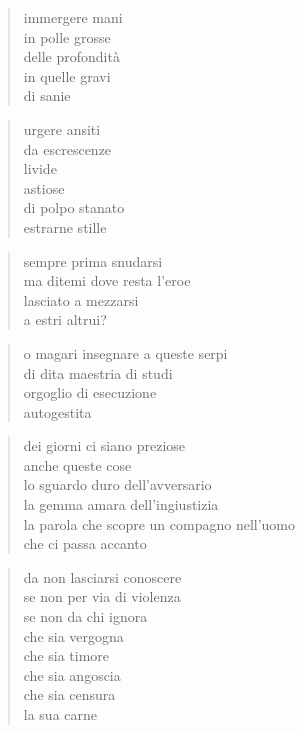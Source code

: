 \clearpage



	\begin{verse}
		immergere mani\\
		in polle grosse\\
		delle profondità\\
		in quelle gravi\\
		di sanie
	\end{verse}

	\begin{verse}
		urgere ansiti\\
		da escrescenze\\
		livide\\
		astiose\\
		di polpo stanato\\
		estrarne stille
	\end{verse}

	\begin{verse}
		sempre prima snudarsi\\
		ma ditemi dove resta l’eroe\\
		lasciato a mezzarsi\\
		a estri altrui?
	\end{verse}

	\begin{verse}
		o magari insegnare a queste serpi\\
		di dita maestria di studi\\
		orgoglio di esecuzione\\
		autogestita
	\end{verse}


\clearpage



	\begin{verse}
                dei giorni ci siano preziose\\
                anche queste cose\\
                lo sguardo duro dell’avversario\\
                la gemma amara dell’ingiustizia\\
                la parola che scopre un compagno nell’uomo\\
                che ci passa accanto
	\end{verse}


\clearpage



	\begin{verse}
		da non lasciarsi conoscere\\
		se non per via di violenza\\
		se non da chi ignora\\
		che sia vergogna\\
		che sia timore\\
		che sia angoscia\\
		che sia censura\\
		la sua carne
	\end{verse}

